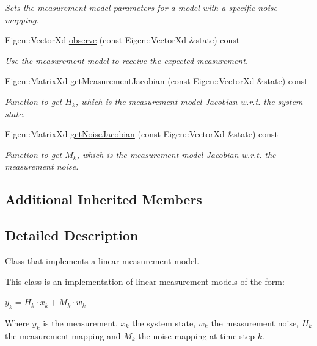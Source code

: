 \begin{DoxyCompactItemize}
\begin{DoxyCompactList}\small\item\em Sets the measurement model parameters for a model with a specific noise mapping. \end{DoxyCompactList}\item 
Eigen\+::\+Vector\+Xd \hyperlink{classrefill_1_1LinearMeasurementModel_a01404c7ce5395e586738d73213c89e59}{observe} (const Eigen\+::\+Vector\+Xd \&state) const 
\begin{DoxyCompactList}\small\item\em Use the measurement model to receive the expected measurement. \end{DoxyCompactList}\item 
Eigen\+::\+Matrix\+Xd \hyperlink{classrefill_1_1LinearMeasurementModel_a84f3241d0ced9d0b017b498bfed438eb}{get\+Measurement\+Jacobian} (const Eigen\+::\+Vector\+Xd \&state) const 
\begin{DoxyCompactList}\small\item\em Function to get $ H_k $, which is the measurement model Jacobian w.\+r.\+t. the system state. \end{DoxyCompactList}\item 
Eigen\+::\+Matrix\+Xd \hyperlink{classrefill_1_1LinearMeasurementModel_ab31ce79fd4d2c62717443a052249f8f6}{get\+Noise\+Jacobian} (const Eigen\+::\+Vector\+Xd \&state) const 
\begin{DoxyCompactList}\small\item\em Function to get $ M_k $, which is the measurement model Jacobian w.\+r.\+t. the measurement noise. \end{DoxyCompactList}\end{DoxyCompactItemize}
\subsection*{Additional Inherited Members}


\subsection{Detailed Description}
Class that implements a linear measurement model. 

This class is an implementation of linear measurement models of the form\+:

$ y_k = H_k \cdot x_k + M_k \cdot w_k $

Where $ y_k $ is the measurement, $ x_k $ the system state, $ w_k $ the measurement noise, $ H_k $ the measurement mapping and $ M_k $ the noise mapping at time step $ k $.

